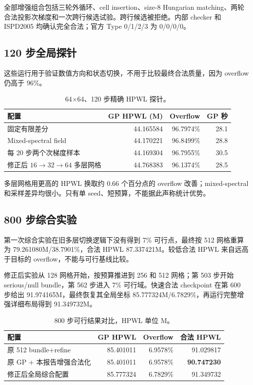 \documentclass[11pt,a4paper]{ctexart}
\newcommand{\code}[1]{\texttt{\detokenize{#1}}}
\begin{document}
全部增强组合包括三轮外循环、cell insertion、size-8 Hungarian matching、两轮合法投影次梯度和一次跨行候选试验。跨行候选被拒绝。内部 checker 和 ISPD2005 \code{legal2.pl} 均确认完全合法；官方 Type 0/1/2/3 为 0/0/0/0。

\subsection{120 步全局探针}

这些运行用于验证数值方向和状态切换，不用于比较最终合法质量，因为 overflow 仍高于 96\%。

\begin{table}[H]
\centering
\caption{64$\times$64、120 步精确 HPWL 探针。}
\begin{tabular}{lrrr}
\toprule
配置 & GP HPWL (M) & Overflow & GP 秒\\
\midrule
固定有限差分 & 44.165584 & 96.7974\% & 28.1\\
Mixed-spectral field & 44.170221 & 96.8499\% & 28.8\\
每 20 步两个次梯度样本 & 44.169304 & 96.7955\% & 30.5\\
修正后 $16\to32\to64$ 多层网格 & 44.768383 & 96.1374\% & 28.5\\
\bottomrule
\end{tabular}
\end{table}

多层网格用更高的 HPWL 换取约 0.66 个百分点的 overflow 改善；mixed-spectral 和采样差异均很小。只有单 seed、短预算，不能据此声称统计优势。

\subsection{800 步综合实验}

第一次综合实验在旧多层切换逻辑下没有得到 7\% 可行点，最终按 512 网格重算为 79.261080M/38.7901\%，合法 HPWL 87.337421M。较低合法 HPWL 来自远高于目标的 overflow，不能与可行基线比较。

修正后实验从 128 网格开始，按预算推进到 256 和 512 网格；第 503 步开始 serious/null bundle，第 562 步进入 7\% 可行域。快速合法 checkpoint 在第 600 步给出 91.974165M，最终恢复其全局坐标 85.777324M/6.7829\%，再运行完整增强详细布局得到 91.349732M。

\begin{table}[H]
\centering
\caption{800 步可行结果对比，HPWL 单位 M。}
\begin{tabular}{lrrr}
\toprule
配置 & GP HPWL & Overflow & 合法 HPWL\\
\midrule
原 512 bundle+refine & 85.401011 & 6.9578\% & 91.029817\\
原 GP + 本报告增强合法化 & 85.401011 & 6.9578\% & \textbf{90.747230}\\
修正后全局综合配置 & 85.777324 & 6.7829\% & 91.349732\\
\bottomrule
\end{tabular}
\end{table}
\end{document}
